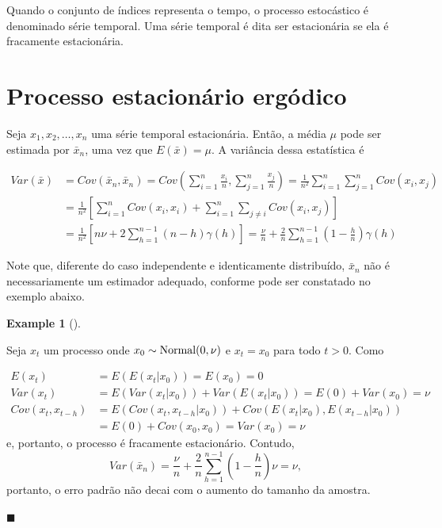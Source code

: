 \documentclass[
  letterpaper,
  DIV=11,
  numbers=noendperiod]{scrartcl}
\theoremstyle{definition}
\newtheorem{example}{Example}[chapter]
\theoremstyle{definition}
\theoremstyle{plain}
\theoremstyle{plain}
\theoremstyle{remark}
\begin{document}
Quando o conjunto de índices representa o tempo, o processo estocástico
é denominado série temporal. Uma série temporal é dita ser estacionária
se ela é fracamente estacionária.

\section{Processo estacionário
ergódico}\label{processo-estacionuxe1rio-erguxf3dico}

Seja \(x_1,x_2,\ldots,x_n\) uma série temporal estacionária. Então, a
média \(\mu\) pode ser estimada por \(\bar{x}_n\), uma vez que
\(E(\bar{x})=\mu\). A variância dessa estatística é

\begin{align}Var(\bar{x})&=Cov(\bar{x}_n,\bar{x}_n)=Cov\left(\sum_{i=1}^n \frac{x_i}{n},\sum_{j=1}^n\frac{x_j}{n}\right)=\frac{1}{n^2}\sum_{i=1}^n\sum_{j=1}^nCov(x_i,x_j)\\
&=\frac{1}{n^2}\left[\sum_{i=1}^nCov(x_i,x_i)+\sum_{i=1}^n\sum_{j\neq i}Cov(x_i,x_j)\right]\\
&=\frac{1}{n^2}\left[n\nu+2\sum_{h=1}^{n-1}(n-h)\gamma(h)\right]=\frac{\nu}{n}+\frac{2}{n}\sum_{h=1}^{n-1}\left(1-\frac{h}{n}\right)\gamma(h)
\end{align}

Note que, diferente do caso independente e identicamente distribuído,
\(\bar{x}_n\) não é necessariamente um estimador adequado, conforme pode
ser constatado no exemplo abaixo.

\begin{example}[]\protect\hypertarget{exm-estationario_nao_ergodico}{}\label{exm-estationario_nao_ergodico}

Seja \(x_t\) um processo onde \(x_0\sim\hbox{Normal}(0,\nu)\) e
\(x_t=x_0\) para todo \(t>0\). Como

\begin{align}
E(x_t)&=E(E(x_t|x_0))=E(x_0)=0\\
Var(x_t)&=E(Var(x_t|x_0))+Var(E(x_t|x_0))=E(0)+Var(x_0)=\nu\\
Cov(x_t,x_{t-h})&=E( Cov(x_t,x_{t-h}|x_0))+Cov( E(x_t|x_0),E(x_{t-h}|x_0))\\
&=E(0)+Cov(x_0,x_0)=Var(x_0)=\nu
\end{align} e, portanto, o processo é fracamente estacionário. Contudo,
\[Var(\bar{x}_n)=\frac{\nu}{n}+\frac{2}{n}\sum_{h=1}^{n-1}\left(1-\frac{h}{n}\right)\nu=\nu,\]
portanto, o erro padrão não decai com o aumento do tamanho da amostra.

\(\blacksquare\)

\end{example}
\end{document}
